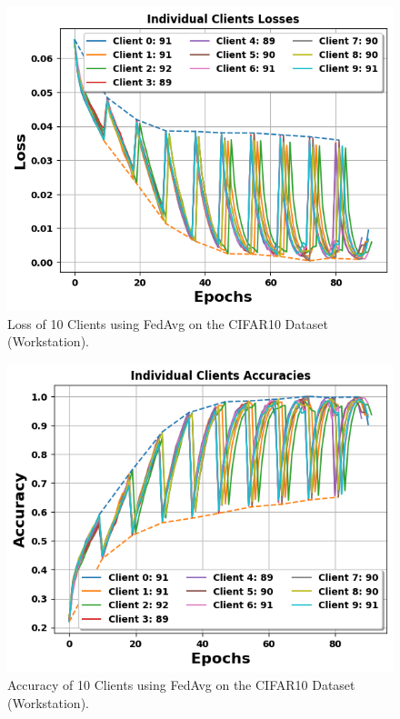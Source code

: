 \documentclass[conference]{IEEEtran}
\begin{document}
%
\begin{figure}[htp!]
	\centering
	\includegraphics[scale=.51]{Images/NEWGRAPHS/GraphhhhhExample.png }
	\caption{Loss of 10 Clients using FedAvg on the CIFAR10 Dataset (Workstation).}
	\label{FedAvgC10}
\end{figure}

\begin{figure}[htp!]
	\centering
	\includegraphics[scale=.51]{Images/NEWGRAPHS/acc.png }
	\caption{Accuracy of 10 Clients using FedAvg on the CIFAR10 Dataset (Workstation).}
	\label{FedAvgC10}
\end{figure}
\end{document}
